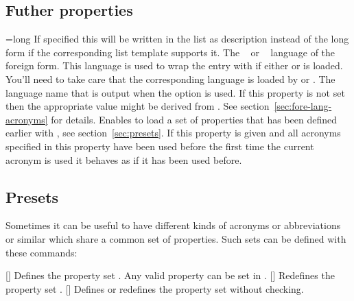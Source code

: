\documentclass{acro-manual}
\begin{document}
\subsection{Futher properties}\label{sec:futher-properties}
\begin{properties}
  \Initial={long}
    If specified this will be written in the list as description instead of
    the long form if the corresponding list template supports it.
  \Initial
    The ~\cite{pkg:babel} or
    ~\cite{pkg:polyglossia} language of the foreign form.
    This language is used to wrap the entry with
     if either  or
     is loaded.  You'll need to take care that the
    corresponding language is loaded by  or .
  \Initial
    The language name that is output when the option
    \code{/} is used.  If this property is not
    set then the appropriate value might be derived from
    . See section~\vref{sec:fore-lang-acronyms} for
    details.
  \Initial
    Enables to load a set of properties that has been
    defined earlier with , see
    section~\vref{sec:presets}.
  \Initial
    If this property is given and all acronyms specified in
    this property have been used before the first time the current acronym is
    used it behaves as if it has been used before.
\end{properties}

\subsection{Presets}\label{sec:presets}
Sometimes it can be useful to have different kinds of
acronyms or abbreviations or similar which share a common set of properties.
Such sets can be defined with these commands:
\begin{commands}
  []
    Defines the property set .  Any valid property can be set
    in .
  []
    Redefines the property set .
  []
    Defines or redefines the property set  without checking.
\end{commands}
\end{document}

